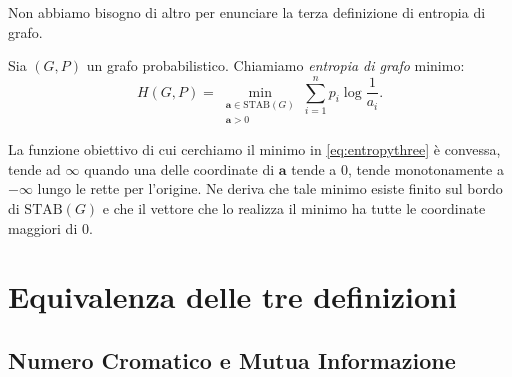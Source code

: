 Non abbiamo bisogno di altro per enunciare la terza definizione di entropia di grafo. 
\begin{definition}
	Sia \((G,P)\) un grafo probabilistico. Chiamiamo \emph{entropia di grafo} minimo: 
	\begin{equation}
		\label{eq:entropythree} H(G,P)=\min_{\substack{\mathbf{a}\in \text{STAB}(G) \\
		\mathbf{a} > 0}} \sum_{i=1}^n p_i \log{\frac{1}{a_i}}. 
	\end{equation}
\end{definition}
\begin{remark}
	La funzione obiettivo di cui cerchiamo il minimo in \eqref{eq:entropythree} è convessa, tende ad \(\infty\) quando una delle coordinate di \(\mathbf{a}\) tende a \(0\), tende monotonamente a \(-\infty\) lungo le rette per l'origine. Ne deriva che tale minimo esiste finito sul bordo di \(\text{STAB}(G)\) e che il vettore che lo realizza il minimo ha tutte le coordinate maggiori di \(0\). 
\end{remark}

\section{Equivalenza delle tre definizioni}

\subsection{Numero Cromatico e Mutua Informazione}

